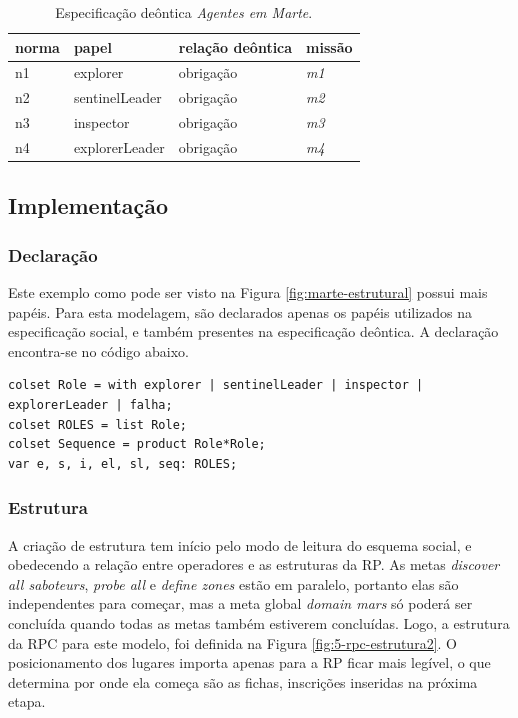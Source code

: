 \begin{table}[ht]
\centering
\caption{Especificação deôntica \textit{Agentes em Marte}. \cite{zatelli2013smadas}}
\label{tab:marte-deontica}
\begin{tabular}{@{}llll@{}}
\toprule
norma   & papel         & relação deôntica  & missão                    \\ \midrule
n1      & explorer          & obrigação         & \textit{m1}               \\
n2      & sentinelLeader    & obrigação         & \textit{m2}               \\
n3      & inspector         & obrigação         & \textit{m3}               \\
n4      & explorerLeader    & obrigação         & \textit{m4}               \\
\bottomrule
\end{tabular}
\end{table}
  
\subsection{Implementação}

\subsubsection{Declaração}

Este exemplo como pode ser visto na Figura \ref{fig:marte-estrutural} possui mais papéis. Para esta modelagem, são declarados apenas os papéis utilizados na especificação social, e também presentes na especificação deôntica. A declaração encontra-se no código abaixo.

\begin{lstlisting}
colset Role = with explorer | sentinelLeader | inspector | explorerLeader | falha;
colset ROLES = list Role;
colset Sequence = product Role*Role;
var e, s, i, el, sl, seq: ROLES;
\end{lstlisting}

\subsubsection{Estrutura}

A criação de estrutura tem início pelo modo de leitura do esquema social, e obedecendo a relação entre operadores e as estruturas da RP. As metas \textit{discover all saboteurs}, \textit{probe all} e \textit{define zones} estão em paralelo, portanto elas são independentes para começar, mas a meta global \textit{domain mars} só poderá ser concluída quando todas as metas também estiverem concluídas. Logo, a estrutura da RPC para este modelo, foi definida na Figura \ref{fig:5-rpc-estrutura2}. O posicionamento dos lugares importa apenas para a RP ficar mais legível, o que determina por onde ela começa são as fichas, inscrições inseridas na próxima etapa.


